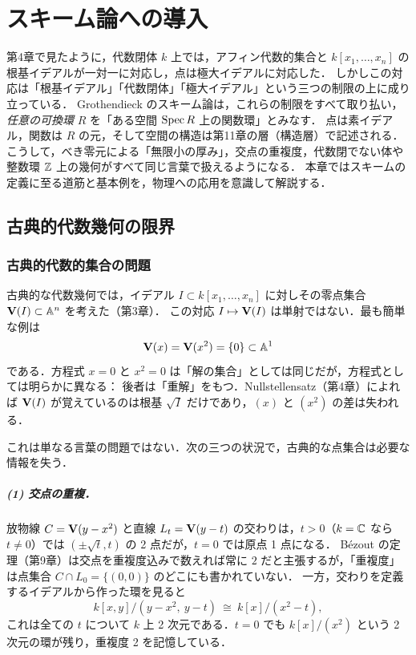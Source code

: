 \chapter{スキーム論への導入}
\label{ch:ch12}

\begin{chapterlead}
第4章で見たように，代数閉体 $k$ 上では，アフィン代数的集合と $k[x_1,\dots,x_n]$ の根基イデアルが一対一に対応し，点は極大イデアルに対応した．
しかしこの対応は「根基イデアル」「代数閉体」「極大イデアル」という三つの制限の上に成り立っている．
Grothendieck のスキーム論は，これらの制限をすべて取り払い，\emph{任意の可換環} $R$ を「ある空間 $\operatorname{Spec} R$ 上の関数環」とみなす．
点は素イデアル，関数は $R$ の元，そして空間の構造は第11章の層（構造層）で記述される．
こうして，べき零元による「無限小の厚み」，交点の重複度，代数閉でない体や整数環 $\mathbb{Z}$ 上の幾何がすべて同じ言葉で扱えるようになる．
本章ではスキームの定義に至る道筋と基本例を，物理への応用を意識して解説する．
\end{chapterlead}

\section{古典的代数幾何の限界}

\subsection{古典的代数的集合の問題}

古典的な代数幾何では，イデアル $I\subset k[x_1,\dots,x_n]$ に対しその零点集合 $\mathbf{V}(I)\subset\mathbb{A}^n$ を考えた（第3章）．
この対応 $I\mapsto\mathbf{V}(I)$ は単射ではない．最も簡単な例は
\[
  \mathbf{V}(x)=\mathbf{V}(x^2)=\{0\}\subset\mathbb{A}^1
\]
である．方程式 $x=0$ と $x^2=0$ は「解の集合」としては同じだが，方程式としては明らかに異なる：
後者は「重解」をもつ．Nullstellensatz（第4章）によれば $\mathbf{V}(I)$ が覚えているのは根基 $\sqrt{I}$ だけであり，$(x)$ と $(x^2)$ の差は失われる．

これは単なる言葉の問題ではない．次の三つの状況で，古典的な点集合は必要な情報を失う．

\paragraph{(1) 交点の重複．}
放物線 $C=\mathbf{V}(y-x^2)$ と直線 $L_t=\mathbf{V}(y-t)$ の交わりは，$t>0$（$k=\mathbb{C}$ なら $t\ne0$）では $(\pm\sqrt t,t)$ の 2 点だが，$t=0$ では原点 1 点になる．
Bézout の定理（第9章）は交点を重複度込みで数えれば常に $2$ だと主張するが，「重複度」は点集合 $C\cap L_0=\{(0,0)\}$ のどこにも書かれていない．
一方，交わりを定義するイデアルから作った環を見ると
\[
  k[x,y]/(y-x^2,\ y-t)\ \cong\ k[x]/(x^2-t),
\]
これは全ての $t$ について $k$ 上 2 次元である．$t=0$ でも $k[x]/(x^2)$ という 2 次元の環が残り，重複度 2 を記憶している．

